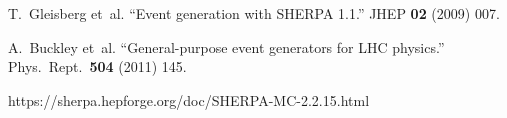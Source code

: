 \documentclass[10pt]{article}
\begin{document}
\begin{thebibliography}{1}

T.~Gleisberg et~al.
``Event generation with SHERPA 1.1.''
JHEP {\bf 02} (2009) 007.

A.~Buckley et~al.
``General-purpose event generators for LHC physics.''
Phys.\ Rept.\ {\bf 504} (2011) 145.

https://sherpa.hepforge.org/doc/SHERPA-MC-2.2.15.html

\end{thebibliography}
\end{document}
